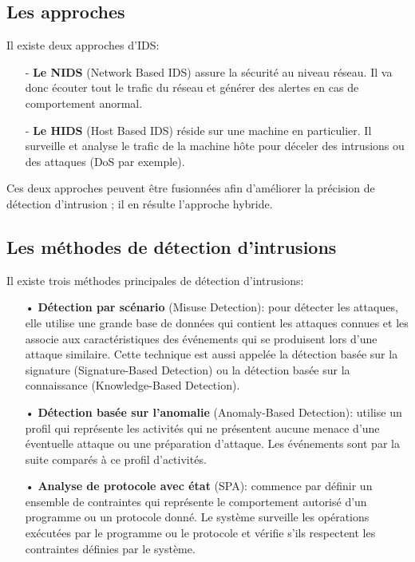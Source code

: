 \subsection{Les approches}
\label{approchesIDS}
Il existe deux approches d’IDS:\\
\begin{itemize}
\item[-]\textbf{Le NIDS} (Network Based IDS) assure la sécurité au niveau réseau. Il va donc écouter tout le trafic du réseau et générer des alertes en cas de comportement anormal.\\
\item[-]\textbf{Le HIDS} (Host Based IDS) réside sur une machine en particulier. Il surveille et analyse le trafic de la machine hôte pour déceler des intrusions ou des attaques (DoS par exemple). \\
\end{itemize}
Ces deux approches peuvent être fusionnées afin d’améliorer la précision de détection d’intrusion ; il en résulte l’approche hybride.

\subsection{Les méthodes de détection d’intrusions} 
Il existe trois méthodes principales de détection d’intrusions:\\
\begin{itemize}
\item[•]\textbf{Détection par scénario} (Misuse Detection): pour détecter les attaques, elle utilise une grande base de données qui contient les attaques connues et les associe aux caractéristiques des événements qui se produisent lors d’une attaque similaire. Cette technique est aussi appelée la détection basée sur la signature (Signature-Based Detection) ou la détection basée sur la connaissance (Knowledge-Based Detection).\\
\item[•]\textbf{Détection basée sur l’anomalie} (Anomaly-Based Detection): utilise un profil qui représente les activités qui ne présentent aucune menace d’une éventuelle attaque ou une préparation d’attaque. Les événements sont par la suite comparés à ce profil d’activités.\\
\item[•]\textbf{Analyse de protocole avec état} (SPA): commence par définir un ensemble de contraintes qui représente le comportement autorisé d’un programme ou un protocole donné. Le système surveille les opérations exécutées par le programme ou le protocole et vérifie s’ils respectent les contraintes définies par le système. 
\end{itemize} 

